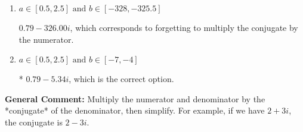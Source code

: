 \documentclass{extbook}[14pt]
\begin{document}
\begin{enumerate}
{\begin{enumerate}[label=\Alph*.]
 $7.20  - 3.67 i$, which corresponds to just dividing the first term by the first term and the second by the second.
\item \( a \in [0.5, 2.5] \text{ and } b \in [-328, -325.5] \)

 $0.79  - 326.00 i$, which corresponds to forgetting to multiply the conjugate by the numerator.
\item \( a \in [0.5, 2.5] \text{ and } b \in [-7, -4] \)

* $0.79  - 5.34 i$, which is the correct option.
\end{enumerate}

\textbf{General Comment:} Multiply the numerator and denominator by the *conjugate* of the denominator, then simplify. For example, if we have $2+3i$, the conjugate is $2-3i$.
}
\end{enumerate}
\end{document}
